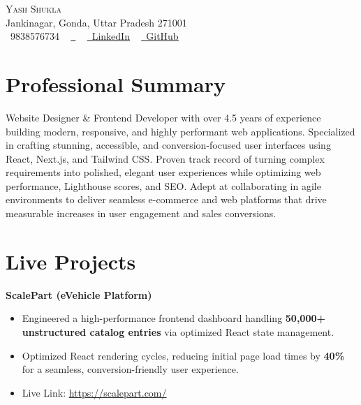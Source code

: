 \documentclass[letterpaper,11pt]{article}
\newcommand{\resumeItem}[1]{
  \item\small{
    {#1 \vspace{-2pt}}
  }
}
\newcommand{\resumeItemListStart}{\begin{itemize}}
\newcommand{\resumeItemListEnd}{\end{itemize}\vspace{-5pt}}
\begin{document}
\begin{center}
    {\Huge \scshape Yash Shukla} \\ \vspace{1pt}
    Jankinagar, Gonda, Uttar Pradesh 271001\\ \vspace{1pt}
    \small \raisebox{-0.1\height}\faPhone\ 9838576734 ~
   \href{mailto:shuklayash457@gmail.com}{\raisebox{-0.2\height}\faEnvelope\ }
  ~ 
    \href{https://www.linkedin.com/in/yash-shukla-b92553212/}{\raisebox{-0.2\height}\faLinkedin\ \underline{LinkedIn}}  ~
    \href{https://github.com/yashshuklaaa}{\raisebox{-0.2\height}\faGithub\ \underline{GitHub}}
    \vspace{-8pt}
\end{center}

\section{Professional Summary}
\small{Website Designer \& Frontend Developer with over 4.5 years of experience building modern, responsive, and highly performant web applications. Specialized in crafting stunning, accessible, and conversion-focused user interfaces using React, Next.js, and Tailwind CSS. Proven track record of turning complex requirements into polished, elegant user experiences while optimizing web performance, Lighthouse scores, and SEO. Adept at collaborating in agile environments to deliver seamless e-commerce and web platforms that drive measurable increases in user engagement and sales conversions.}
\vspace{2pt}

\section{Live Projects}
\vspace{4pt}

\textbf{ScalePart (eVehicle Platform)} \\
\vspace{2pt}
\resumeItemListStart
    \resumeItem{Engineered a high-performance frontend dashboard handling \textbf{50,000+ unstructured catalog entries} via optimized React state management.}
    \resumeItem{Optimized React rendering cycles, reducing initial page load times by \textbf{40\%} for a seamless, conversion-friendly user experience.}
    \vspace{-4pt}
    \resumeItem{Live Link: \href{https://scalepart.com/}{https://scalepart.com/}}
\resumeItemListEnd
\end{document}

